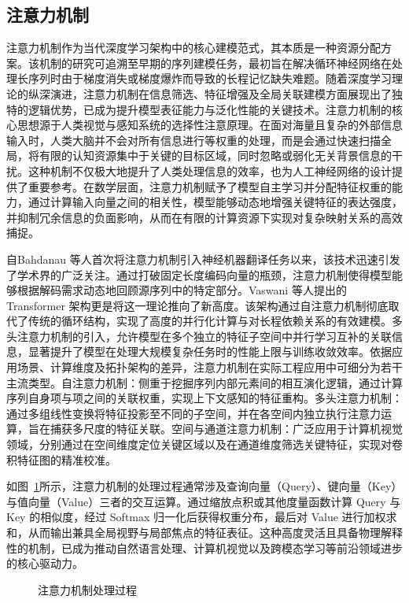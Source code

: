 \subsection{注意力机制}
注意力机制作为当代深度学习架构中的核心建模范式，其本质是一种资源分配方案。该机制的研究可追溯至早期的序列建模任务，最初旨在解决循环神经网络在处理长序列时由于梯度消失或梯度爆炸而导致的长程记忆缺失难题。随着深度学习理论的纵深演进，注意力机制在信息筛选、特征增强及全局关联建模方面展现出了独特的逻辑优势，已成为提升模型表征能力与泛化性能的关键技术。注意力机制的核心思想源于人类视觉与感知系统的选择性注意原理。在面对海量且复杂的外部信息输入时，人类大脑并不会对所有信息进行等权重的处理，而是会通过快速扫描全局，将有限的认知资源集中于关键的目标区域，同时忽略或弱化无关背景信息的干扰。这种机制不仅极大地提升了人类处理信息的效率，也为人工神经网络的设计提供了重要参考。在数学层面，注意力机制赋予了模型自主学习并分配特征权重的能力，通过计算输入向量之间的相关性，模型能够动态地增强关键特征的表达强度，并抑制冗余信息的负面影响，从而在有限的计算资源下实现对复杂映射关系的高效捕捉。

自Bahdanau 等人首次将注意力机制引入神经机器翻译任务以来，该技术迅速引发了学术界的广泛关注\cite{bahdanau2014neural}。通过打破固定长度编码向量的瓶颈，注意力机制使得模型能够根据解码需求动态地回顾源序列中的特定部分。Vaswani 等人提出的 Transformer 架构更是将这一理论推向了新高度\cite{vaswani2017attention}。该架构通过自注意力机制彻底取代了传统的循环结构，实现了高度的并行化计算与对长程依赖关系的有效建模。多头注意力机制的引入，允许模型在多个独立的特征子空间中并行学习互补的关联信息，显著提升了模型在处理大规模复杂任务时的性能上限与训练收敛效率。依据应用场景、计算维度及拓扑架构的差异，注意力机制在实际工程应用中可细分为若干主流类型。自注意力机制：侧重于挖掘序列内部元素间的相互演化逻辑，通过计算序列自身项与项之间的关联权重，实现上下文感知的特征重构。多头注意力机制：通过多组线性变换将特征投影至不同的子空间，并在各空间内独立执行注意力运算，旨在捕获多尺度的特征关联。空间与通道注意力机制：广泛应用于计算机视觉领域，分别通过在空间维度定位关键区域以及在通道维度筛选关键特征，实现对卷积特征图的精准校准。

如图~\ref{fig:attention}所示，注意力机制的处理过程通常涉及查询向量（Query）、键向量（Key）与值向量（Value）三者的交互运算。通过缩放点积或其他度量函数计算 Query 与 Key 的相似度，经过 Softmax 归一化后获得权重分布，最后对 Value 进行加权求和，从而输出兼具全局视野与局部焦点的特征表征。这种高度灵活且具备物理解释性的机制，已成为推动自然语言处理、计算机视觉以及跨模态学习等前沿领域进步的核心驱动力\cite{niu2021review}。

\begin{figure}[ht]
  \centering
  \caption{注意力机制处理过程}
  \label{fig:attention}
\end{figure}

